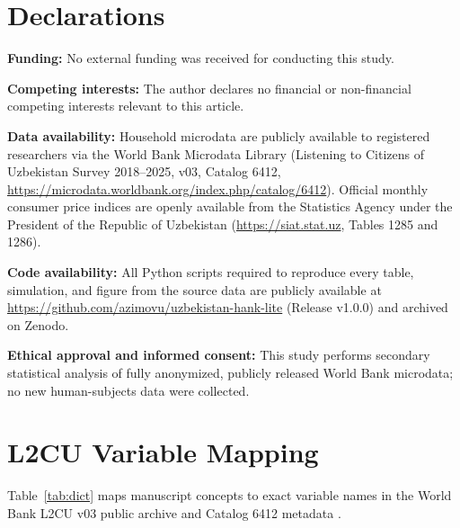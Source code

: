 \documentclass[11pt]{article}
\begin{document}
\section*{Declarations}

\noindent\textbf{Funding:} No external funding was received for conducting this study.

\medskip\noindent\textbf{Competing interests:} The author declares no financial or non-financial competing interests relevant to this article.

\medskip\noindent\textbf{Data availability:} Household microdata are publicly available to registered researchers via the World Bank Microdata Library (Listening to Citizens of Uzbekistan Survey 2018--2025, v03, Catalog 6412, \url{https://microdata.worldbank.org/index.php/catalog/6412}). Official monthly consumer price indices are openly available from the Statistics Agency under the President of the Republic of Uzbekistan (\url{https://siat.stat.uz}, Tables 1285 and 1286).

\medskip\noindent\textbf{Code availability:} All Python scripts required to reproduce every table, simulation, and figure from the source data are publicly available at \url{https://github.com/azimovu/uzbekistan-hank-lite} (Release v1.0.0) and archived on Zenodo.

\medskip\noindent\textbf{Ethical approval and informed consent:} This study performs secondary statistical analysis of fully anonymized, publicly released World Bank microdata; no new human-subjects data were collected.

\clearpage
\appendix
\section{L2CU Variable Mapping}\label{app:dict}

Table~\ref{tab:dict} maps manuscript concepts to exact variable names in the World Bank L2CU v03 public archive and Catalog 6412 metadata \citep{WB2025L2CU}.
\end{document}
